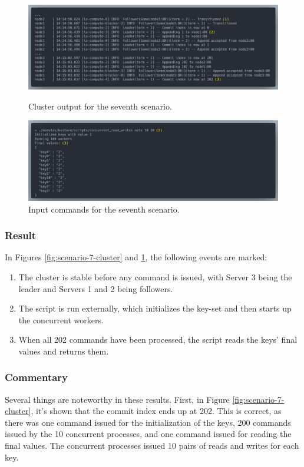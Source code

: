 \begin{figure}[!ht]
\centering
\includegraphics[width=500pt]{images/scenario_7_cluster.png}
\caption{Cluster output for the seventh scenario.}
\label{fig:scenario-7-cluster}
\includegraphics[width=500pt]{images/scenario_7_commands.png}
\caption{Input commands for the seventh scenario.}
\label{fig:scenario-7-commands}
\end{figure}

\subsubsection{Result}
In Figures \ref{fig:scenario-7-cluster} and \ref{fig:scenario-7-commands}, the following events are marked:
\begin{enumerate}
    \item The cluster is stable before any command is issued, with Server 3 being the leader and Servers 1 and 2 being followers.
    \item The script is run externally, which initializes the key-set and then starts up the concurrent workers.
    \item When all 202 commands have been processed, the script reads the keys' final values and returns them.
\end{enumerate}

\subsubsection{Commentary}
Several things are noteworthy in these results. First, in Figure \ref{fig:scenario-7-cluster}, it's shown that the commit index ends up at 202. This is correct, as there was one command issued for the initialization of the keys, 200 commands issued by the 10 concurrent processes, and one command issued for reading the final values. The concurrent processes issued 10 pairs of reads and writes for each key.\\

